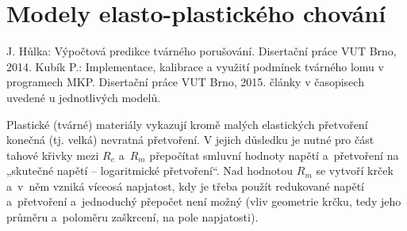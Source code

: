 
\section{Modely elasto-plastického chování}

J. Hůlka: Výpočtová predikce tvárného porušování. Disertační práce VUT Brno, 2014.
Kubík P.: Implementace, kalibrace a využití podmínek tvárného lomu v programech MKP. Disertační práce VUT Brno, 2015.
články v časopisech uvedené u jednotlivých modelů.

Plastické (tvárné) materiály vykazují kromě malých elastických přetvoření konečná (tj. velká) nevratná přetvoření. V jejich důsledku je nutné pro část tahové křivky mezi $R_e$ a~$R_m$ přepočítat smluvní hodnoty napětí a~přetvoření na „skutečné napětí -- logaritmické přetvoření“.
Nad hodnotou $R_m$ se vytvoří krček a~v~něm vzniká víceosá napjatost, kdy je třeba použít redukované napětí a~přetvoření a~jednoduchý přepočet není možný (vliv geometrie krčku, tedy jeho průměru a~poloměru zaškrcení, na pole napjatosti).

